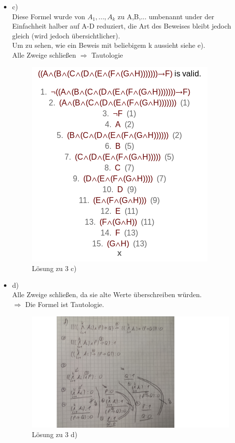 \documentclass[a4paper]{scrartcl}
\begin{document}
\begin{itemize}
    \item c)\\

        Diese Formel wurde von $A_1,...,A_k$ zu A,B,... umbenannt under der Einfachheit halber auf A-D reduziert, die Art des Beweises bleibt jedoch gleich (wird jedoch übersichtlicher).\\
        Um zu sehen, wie ein Beweis mit beliebigem k aussieht siehe e).\\
        Alle Zweige schließen $\Rightarrow$ Tautologie\\

        \begin{figure}[H]
            \centering
            \includegraphics[scale=0.49]{3-c-tree.png}
            \caption{Lösung zu 3 c)}
            \label{fig:name}
        \end{figure}

    \item d)\\

        Alle Zweige schließen, da sie alte Werte überschreiben würden.\\
        $\Rightarrow$ Die Formel ist Tautologie.

        \begin{figure}[H]
            \centering
            \includegraphics[scale=0.25]{3-d-tree.png}
            \caption{Lösung zu 3 d)}
            \label{fig:name}
        \end{figure}


\end{itemize}
\end{document}
